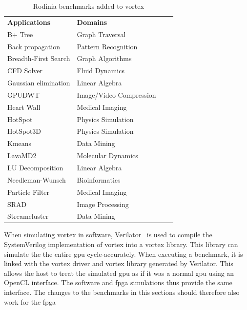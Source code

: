 \begin{table}
    \centering
    \caption{Rodinia benchmarks added to \Gls{vortex}}
    \begin{tabular}{|l|l|l|l|} 
        \hline
        \textbf{Applications}      & \textbf{Domains} \\ \hhline{|=|=|}
        B+ Tree                    & Graph Traversal \\ \hline
        Back propagation           & Pattern Recognition \\ \hline
        Breadth-First Search       & Graph Algorithms  \\ \hline
        CFD Solver                 & Fluid Dynamics  \\ \hline
        Gaussian elimination       & Linear Algebra \\ \hline
        GPUDWT                     & Image/Video Compression  \\ \hline
        Heart Wall                 & Medical Imaging \\ \hline
        HotSpot                    & Physics Simulation  \\ \hline
        HotSpot3D                  & Physics Simulation  \\ \hline
        Kmeans                     & Data Mining \\ \hline
        LavaMD2                    & Molecular Dynamics\\ \hline
        LU Decomposition           & Linear Algebra  \\ \hline
        Needleman-Wunsch           & Bioinformatics\\ \hline
        Particle Filter            & Medical Imaging \\ \hline
        SRAD                       & Image Processing  \\ \hline
        Streamcluster              & Data Mining \\ \hline
    \end{tabular}
    \label{tab:new_benchmarks}
\end{table}

When simulating \Gls{vortex} in software, Verilator~\cite{verilator} is used to compile the SystemVerilog implementation of \Gls{vortex} into a vortex library. This library can simulate the the entire \acrshort{gpu} cycle-accurately. When executing a benchmark, it is linked with the \Gls{vortex} driver and \Gls{vortex} library generated by Verilator. This allows the host to treat the simulated \acrshort{gpu} as if it was a normal \acrshort{gpu} using an OpenCL interface. The software and \acrshort{fpga} simulations thus provide the same interface. The changes to the benchmarks in this sections should therefore also work for the \acrshort{fpga} 

